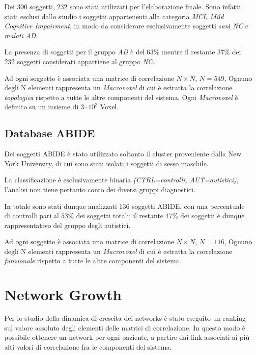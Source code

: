 \documentclass[12pt,openright,a4paper]{article}
\begin{document}
Dei 300 soggetti, 232 sono stati utilizzati per l'elaborazione finale. Sono infatti stati esclusi dallo studio i soggetti appartenenti alla categoria \textit{MCI, Mild Cognitive Impairment}, in modo da considerare esclusivamente soggetti \textit{san}i \textit{NC} e \textit{malati} \textit{AD}.

 La presenza di soggetti per il gruppo \textit{AD} è del $63 \% $ mentre il restante  $37 \%$ dei 232 soggetti considerati appartiene al gruppo \textit{NC}.

Ad ogni soggetto è associata una matrice di correlazione $N\times N$, $N=549$, Ognuno degli N elementi rappresenta un \textit{Macrovoxel} di cui è estratta la correlazione \textit{topologica} rispetto a tutte le altre componenti del sistema. Ogni \textit{Macrovoxel} è definito su un insieme di $3\cdot10^3$ Voxel.

\subsection{Database ABIDE}

Dei soggetti ABIDE è stato utilizzato soltanto il cluster proveniente dalla New York University, di cui sono stati isolati i soggetti di sesso maschile.

La classificazione è esclusivamente binaria \textit{(CTRL=controlli, AUT=autistici)}, l'analisi non tiene pertanto conto dei diversi gruppi diagnostici.

In totale sono stati dunque analizzati 136 soggetti ABIDE, con una percentuale di controlli pari al $53\%$ dei soggetti totali; il restante $47\%$ dei soggetti è dunque rappresentativo del gruppo degli autistici.

 Ad ogni soggetto è associata una matrice di correlazione $N\times N$, $N=116$, Ognuno degli N elementi rappresenta un \textit{Macrovoxel} di cui è estratta la correlazione \textit{funzionale} rispetto a tutte le altre componenti del sistema.

\section{Network Growth}

Per lo studio della dinamica di crescita dei networks è stato eseguito un ranking sul valore assoluto degli elementi delle matrici di correlazione. In questo modo è possibile ottenere un network per ogni paziente, a partire dai link associati ai più alti valori di correlazione fra le componenti del sistema. 
\end{document}
